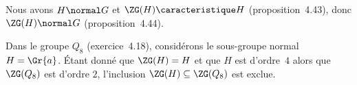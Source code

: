 Nous avons $H\normal G$ et $\ZG(H)\caracteristique H$ (proposition~4.43), donc $\ZG(H)\normal G$ (proposition~4.44).

Dans le groupe $Q_8$ (exercice~4.18), considérons le sous-groupe normal $H = \Gr{a}$.
Étant donné que $\ZG(H) = H$ et que $H$ est d'ordre~$4$ alors que $\ZG(Q_8)$ est d'ordre $2$, l'inclusion $\ZG(H) \subseteq \ZG(Q_8)$ est exclue.
